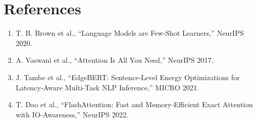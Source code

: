 \documentclass{article}
\begin{document}

\section*{References}

\begin{enumerate}

\item T. B. Brown et al., ``Language Models are Few-Shot Learners,'' NeurIPS 2020.

\item A. Vaswani et al., ``Attention Is All You Need,'' NeurIPS 2017.

\item J. Tambe et al., ``EdgeBERT: Sentence-Level Energy Optimizations for Latency-Aware Multi-Task NLP Inference,'' MICRO 2021.

\item T. Dao et al., ``FlashAttention: Fast and Memory-Efficient Exact Attention with IO-Awareness,'' NeurIPS 2022.

\end{enumerate}
\end{document}
